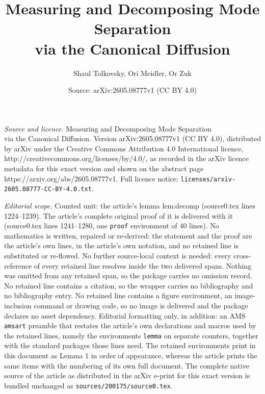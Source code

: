 \documentclass[10pt,a4paper]{amsart}
\title{Measuring and Decomposing Mode Separation\\via the Canonical Diffusion}
\author{Shaul Tolkovsky, Ori Meidler, Or Zuk}
\date{Source: arXiv:2605.08777v1 (CC BY 4.0)}
\begin{document}
\maketitle

\noindent\emph{Source and licence.} Measuring and Decomposing Mode Separation\\via the Canonical Diffusion. Version arXiv:2605.08777v1 (CC BY 4.0), distributed by arXiv under the Creative Commons Attribution 4.0 International licence, http://creativecommons.org/licenses/by/4.0/, as recorded in the arXiv licence metadata for this exact version and shown on the abstract page https://arxiv.org/abs/2605.08777v1. Full licence notice: \texttt{licenses/arxiv-2605.08777-CC-BY-4.0.txt}.\par\smallskip

\noindent\textit{Editorial scope.} Counted unit: the article's lemma lem:decomp (source0.tex lines 1224--1239). The article's complete original proof of it is delivered with it (source0.tex lines 1241--1280, one \texttt{proof} environment of 40 lines). No mathematics is written, repaired or re-derived: the statement and the proof are the article's own lines, in the article's own notation, and no retained line is substituted or re-flowed.  No further source-local context is needed: every cross-reference of every retained line resolves inside the two delivered spans.  Nothing was omitted from any retained span, so the package carries no omission record.  No retained line contains a citation, so the wrapper carries no bibliography and no bibliography entry.  No retained line contains a figure environment, an image-inclusion command or drawing code, so no image is delivered and the package declares no asset dependency.  Editorial formatting only, in addition: an AMS \texttt{amsart} preamble that restates the article's own declarations and macros used by the retained lines, namely the environments \texttt{lemma} on separate counters, together with the standard packages those lines need.  The retained environments print in this document as Lemma 1 in order of appearance, whereas the article prints the same items with the numbering of its own full document.  The complete native source of the article as distributed in the arXiv e-print for this exact version is bundled unchanged as \texttt{sources/200175/source0.tex}.
\end{document}
